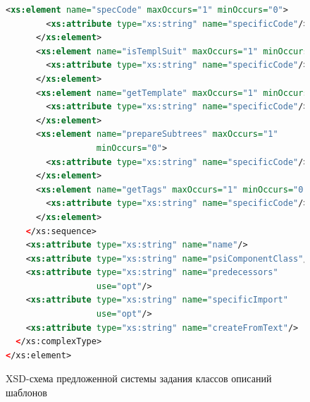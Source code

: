 \begin{figure}
    \begin{lstlisting}[language=xml]
      <xs:element name="specCode" maxOccurs="1" minOccurs="0">
        <xs:attribute type="xs:string" name="specificCode"/>
      </xs:element>
      <xs:element name="isTemplSuit" maxOccurs="1" minOccurs="0">
        <xs:attribute type="xs:string" name="specificCode"/>
      </xs:element>
      <xs:element name="getTemplate" maxOccurs="1" minOccurs="0">
        <xs:attribute type="xs:string" name="specificCode"/>
      </xs:element>
      <xs:element name="prepareSubtrees" maxOccurs="1" 
                  minOccurs="0">
        <xs:attribute type="xs:string" name="specificCode"/>
      </xs:element>
      <xs:element name="getTags" maxOccurs="1" minOccurs="0">
        <xs:attribute type="xs:string" name="specificCode"/>
      </xs:element>
    </xs:sequence>
    <xs:attribute type="xs:string" name="name"/>
    <xs:attribute type="xs:string" name="psiComponentClass"/>
    <xs:attribute type="xs:string" name="predecessors" 
                  use="opt"/>
    <xs:attribute type="xs:string" name="specificImport" 
                  use="opt"/>
    <xs:attribute type="xs:string" name="createFromText"/>
  </xs:complexType>
</xs:element>
    \end{lstlisting}
\caption{XSD-схема предложенной системы задания классов описаний шаблонов}    
\label{XSD-scheme}
\end{figure}

